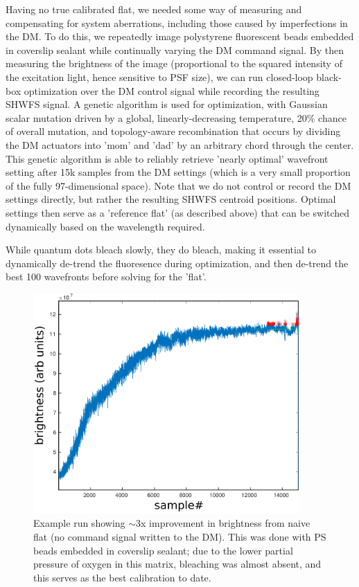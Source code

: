 \documentclass[a4paper,12pt]{article}
\begin{document}
Having no true calibrated flat, we needed some way of measuring and compensating for system aberrations, including those caused by imperfections in the DM.  To do this, we repeatedly image polystyrene fluorescent beads embedded in coverslip sealant while continually varying the DM command signal.  By then measuring the brightness of the image (proportional to the squared intensity of the excitation light, hence sensitive to PSF size), we can run closed-loop black-box optimization over the DM control signal while recording the resulting SHWFS signal.  A genetic algorithm is used for optimization, with Gaussian scalar mutation driven by a global, linearly-decreasing temperature, 20\% chance of overall mutation, and topology-aware recombination that occurs by dividing the DM actuators into 'mom' and 'dad' by an arbitrary chord through the center.  This genetic algorithm is able to reliably retrieve 'nearly optimal' wavefront setting after 15k samples from the DM settings (which is a very small proportion of the fully 97-dimensional space).  Note that we do not control or record the DM settings directly, but rather the resulting SHWFS centroid positions.  Optimal settings then serve as a 'reference flat' (as described above) that can be switched dynamically based on the wavelength required.  

While quantum dots bleach slowly, they do bleach, making it essential to dynamically de-trend the fluoresence during optimization, and then de-trend the best 100 wavefronts before solving for the 'flat'.

\begin{figure}
\centering
\includegraphics[width=4in]{PSbeads_optimization_run.pdf}
\caption{Example run showing $\sim$3x improvement in brightness from naive flat (no command signal written to the DM).  This was done with PS beads embedded in coverslip sealant; due to the lower partial pressure of oxygen in this matrix, bleaching was almost absent, and this serves as the best calibration to date.}
\end{figure}
\end{document}
